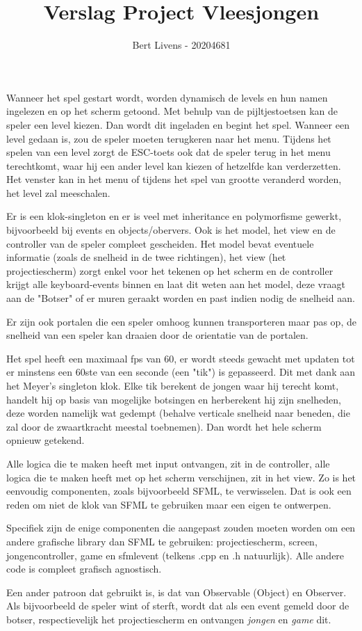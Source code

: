 \documentclass[12pt,a4paper]{article}
\title{Verslag Project Vleesjongen}
\author{Bert Livens - 20204681}
\begin{document}
\maketitle

Wanneer het spel gestart wordt, worden dynamisch de levels en hun namen ingelezen en op het scherm getoond. Met behulp van de pijltjestoetsen kan de speler een level kiezen. Dan wordt dit ingeladen en begint het spel. Wanneer een level gedaan is, zou de speler moeten terugkeren naar het menu. Tijdens het spelen van een level zorgt de ESC-toets ook dat de speler terug in het menu terechtkomt, waar hij een ander level kan kiezen of hetzelfde kan verderzetten. Het venster kan in het menu of tijdens het spel van grootte veranderd worden, het level zal meeschalen.

Er is een klok-singleton en er is veel met inheritance en polymorfisme gewerkt, bijvoorbeeld bij events en objects/obervers. Ook is het model, het view en de controller van de speler compleet gescheiden. Het model bevat eventuele informatie (zoals de snelheid in de twee richtingen), het view (het projectiescherm) zorgt enkel voor het tekenen op het scherm en de controller krijgt alle keyboard-events binnen en laat dit weten aan het model, deze vraagt aan de "Botser" of er muren geraakt worden en past indien nodig de snelheid aan.

Er zijn ook portalen die een speler omhoog kunnen transporteren maar pas op, de snelheid van een speler kan draaien door de orientatie van de portalen.

Het spel heeft een maximaal fps van 60, er wordt steeds gewacht met updaten tot er minstens een 60ste van een seconde (een "tik") is gepasseerd. Dit met dank aan het Meyer's singleton klok. Elke tik berekent de jongen waar hij terecht komt, handelt hij op basis van mogelijke botsingen en herberekent hij zijn snelheden, deze worden namelijk wat gedempt (behalve verticale snelheid naar beneden, die zal door de zwaartkracht meestal toebnemen). Dan wordt het hele scherm opnieuw getekend.


Alle logica die te maken heeft met input ontvangen, zit in de controller, alle logica die te maken heeft met op het scherm verschijnen, zit in het view. Zo is het eenvoudig componenten, zoals bijvoorbeeld SFML, te verwisselen. Dat is ook een reden om niet de klok van SFML te gebruiken maar een eigen te ontwerpen.

Specifiek zijn de enige componenten die aangepast zouden moeten worden om een andere grafische library dan SFML te gebruiken: projectiescherm, screen, jongencontroller, game en sfmlevent (telkens .cpp en .h natuurlijk). Alle andere code is compleet grafisch agnostisch. 

Een ander patroon dat gebruikt is, is dat van Observable (Object) en Observer. Als bijvoorbeeld de speler wint of sterft, wordt dat als een event gemeld door de botser, respectievelijk het projectiescherm en ontvangen \textit{jongen} en \textit{game} dit.
\end{document}
